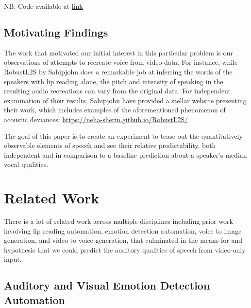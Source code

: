 \documentclass[10pt,twocolumn,letterpaper]{article}
\begin{document}
NB: Code available at \href{https://drive.google.com/file/d/1mdd65EOMFP_0xZQxeuzi8KavXK4nI_mL/view?usp=drive_link}{link}

\subsection{Motivating Findings}

The work that motivated our initial interest in this particular problem is our observations of attempts to  recreate voice from video data. For instance, while RobustL2S by Sahipjohn  \cite{RobustL2S} does a remarkable job at inferring the words of the speakers with lip reading alone, the pitch and intensity of speaking in the resulting audio recreations can vary from the original data. For independent examination of their results, Sahipjohn  have provided a stellar website presenting their work, which includes examples of the aforementioned phenomenon of acoustic deviances: \href{https://neha-sherin.github.io/RobustL2S/}{https://neha-sherin.github.io/RobustL2S/}.

The goal of this paper is to create an experiment to tease out the quantitatively observable elements of speech and see their relative predictability, both independent and in comparison to a baseline prediction about a speaker's median vocal qualities.  

\section{Related Work}
\label{sec:related}

There is a lot of related work across multiple disciplines including prior work involving lip reading automation, emotion detection automation, voice to image generation, and video to voice generation, that culminated in the means for and hypothesis that we could predict the auditory qualities of speech from video-only input.


\subsection{Auditory and Visual Emotion Detection Automation}
\end{document}
